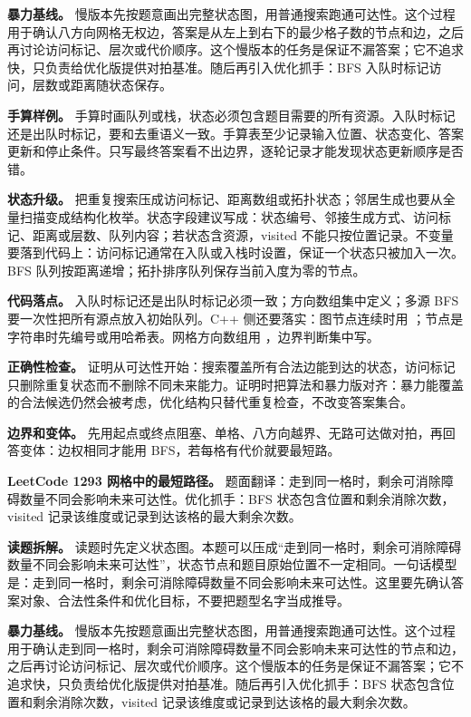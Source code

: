 \textbf{暴力基线。} 慢版本先按题意画出完整状态图，用普通搜索跑通可达性。这个过程用于确认八方向网格无权边，答案是从左上到右下的最少格子数的节点和边，之后再讨论访问标记、层次或代价顺序。这个慢版本的任务是保证不漏答案；它不追求快，只负责给优化版提供对拍基准。随后再引入优化抓手：BFS 入队时标记访问，层数或距离随状态保存。

\textbf{手算样例。} 手算时画队列或栈，状态必须包含题目需要的所有资源。入队时标记还是出队时标记，要和去重语义一致。手算表至少记录输入位置、状态变化、答案更新和停止条件。只写最终答案看不出边界，逐轮记录才能发现状态更新顺序是否错。

\textbf{状态升级。} 把重复搜索压成访问标记、距离数组或拓扑状态；邻居生成也要从全量扫描变成结构化枚举。状态字段建议写成：状态编号、邻接生成方式、访问标记、距离或层数、队列内容；若状态含资源，visited 不能只按位置记录。不变量要落到代码上：访问标记通常在入队或入栈时设置，保证一个状态只被加入一次。BFS 队列按距离递增；拓扑排序队列保存当前入度为零的节点。

\textbf{代码落点。} 入队时标记还是出队时标记必须一致；方向数组集中定义；多源 BFS 要一次性把所有源点放入初始队列。C++ 侧还要落实：图节点连续时用 ；节点是字符串时先编号或用哈希表。网格方向数组用 ，边界判断集中写。

\textbf{正确性检查。} 证明从可达性开始：搜索覆盖所有合法边能到达的状态，访问标记只删除重复状态而不删除不同未来能力。证明时把算法和暴力版对齐：暴力能覆盖的合法候选仍然会被考虑，优化结构只替代重复检查，不改变答案集合。

\textbf{边界和变体。} 先用起点或终点阻塞、单格、八方向越界、无路可达做对拍，再回答变体：边权相同才能用 BFS，若每格有代价就要最短路。

\noindent\textbf{LeetCode 1293 网格中的最短路径。} 题面翻译：走到同一格时，剩余可消除障碍数量不同会影响未来可达性。优化抓手：BFS 状态包含位置和剩余消除次数，visited 记录该维度或记录到达该格的最大剩余次数。

\textbf{读题拆解。} 读题时先定义状态图。本题可以压成“走到同一格时，剩余可消除障碍数量不同会影响未来可达性”，状态节点和题目原始位置不一定相同。一句话模型是：走到同一格时，剩余可消除障碍数量不同会影响未来可达性。这里要先确认答案对象、合法性条件和优化目标，不要把题型名字当成推导。

\textbf{暴力基线。} 慢版本先按题意画出完整状态图，用普通搜索跑通可达性。这个过程用于确认走到同一格时，剩余可消除障碍数量不同会影响未来可达性的节点和边，之后再讨论访问标记、层次或代价顺序。这个慢版本的任务是保证不漏答案；它不追求快，只负责给优化版提供对拍基准。随后再引入优化抓手：BFS 状态包含位置和剩余消除次数，visited 记录该维度或记录到达该格的最大剩余次数。


